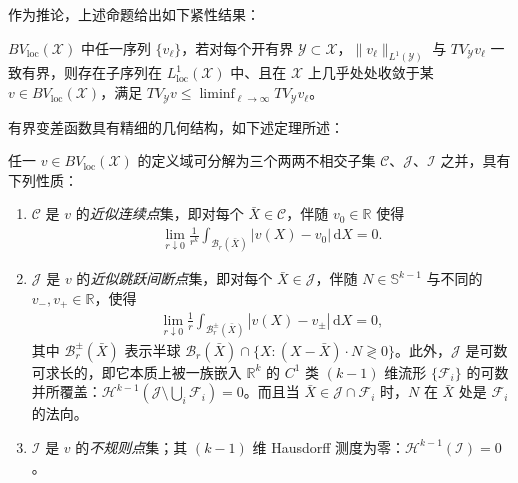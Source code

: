 \documentclass[../../main.tex]{subfiles}
\begin{document}
作为推论，上述命题给出如下紧性结果：

\begin{theorem}\label{theorem:ch01-BV紧性}
$BV_{\mathrm{loc}}(\mathscr{X})$ 中任一序列 $\{v_{\ell}\}$，若对每个开有界 $\mathscr{Y}\subset\mathscr{X}$，$\|v_{\ell}\|_{L^{1}(\mathscr{Y})}$ 与 $TV_{\mathscr{Y}}v_{\ell}$ 一致有界，则存在子序列在 $L^{1}_{\mathrm{loc}}(\mathscr{X})$ 中、且在 $\mathscr{X}$ 上几乎处处收敛于某 $v\in BV_{\mathrm{loc}}(\mathscr{X})$，满足 $TV_{\mathscr{Y}}v\leqslant\liminf_{\ell\to\infty}TV_{\mathscr{Y}}v_{\ell}$。
\end{theorem}

有界变差函数具有精细的几何结构，如下述定理所述：

\begin{theorem}\label{theorem:ch01-BV-三分}
任一 $v\in BV_{\mathrm{loc}}(\mathscr{X})$ 的定义域可分解为三个两两不相交子集 $\mathscr{C}$、$\mathscr{J}$、$\mathscr{I}$ 之并，具有下列性质：
\begin{enumerate}
\item\label{item:ch01-BV-三分-c} $\mathscr{C}$ 是 $v$ 的\emph{近似连续点}集，即对每个 $\bar{X}\in\mathscr{C}$，伴随 $v_{0}\in\mathbb{R}$ 使得
\begin{align}
\lim_{r\downarrow 0}\frac{1}{r^{k}}\int_{\mathscr{B}_{r}(\bar{X})}|v(X)-v_{0}|\,\mathrm{d}X=0.\label{align:ch01-approx-continuity}
\end{align}
\item\label{item:ch01-BV-三分-j} $\mathscr{J}$ 是 $v$ 的\emph{近似跳跃间断点}集，即对每个 $\bar{X}\in\mathscr{J}$，伴随 $N\in\mathbb{S}^{k-1}$ 与不同的 $v_{-},v_{+}\in\mathbb{R}$，使得
\begin{align}
\lim_{r\downarrow 0}\frac{1}{r}\int_{\mathscr{B}_{r}^{\pm}(\bar{X})}|v(X)-v_{\pm}|\,\mathrm{d}X=0,\label{align:ch01-approx-jump}
\end{align}
其中 $\mathscr{B}_{r}^{\pm}(\bar{X})$ 表示半球 $\mathscr{B}_{r}(\bar{X})\cap\{X:(X-\bar{X})\cdot N\gtrless 0\}$。此外，$\mathscr{J}$ 是可数可求长的，即它本质上被一族嵌入 $\mathbb{R}^{k}$ 的 $C^{1}$ 类 $(k-1)$ 维流形 $\{\mathscr{F}_{i}\}$ 的可数并所覆盖：$\mathscr{H}^{k-1}(\mathscr{J}\setminus\bigcup_{i}\mathscr{F}_{i})=0$。而且当 $\bar{X}\in\mathscr{J}\cap\mathscr{F}_{i}$ 时，$N$ 在 $\bar{X}$ 处是 $\mathscr{F}_{i}$ 的法向。
\item\label{item:ch01-BV-三分-i} $\mathscr{I}$ 是 $v$ 的\emph{不规则点}集；其 $(k-1)$ 维 Hausdorff 测度为零：$\mathscr{H}^{k-1}(\mathscr{I})=0$。
\end{enumerate}
\end{theorem}
\end{document}
